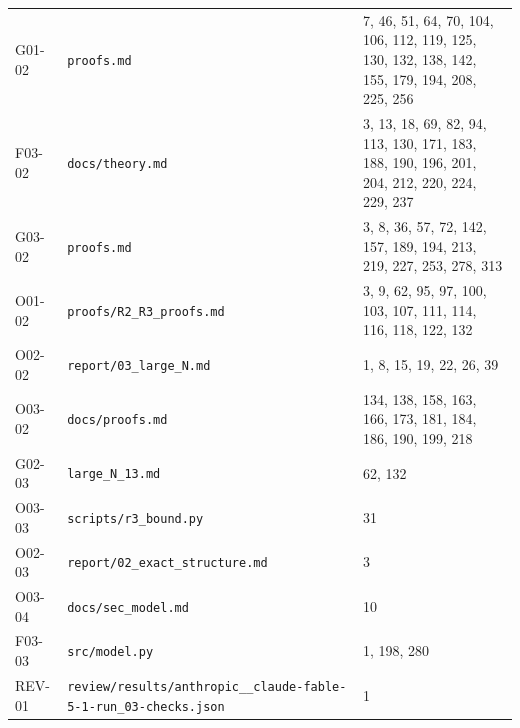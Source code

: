 \documentclass[11pt,a4paper]{article}
\begin{document}
{\begin{longtable}
{}\label{src:G01-02}G01-02 & \nolinkurl{proofs.md} & 7,\allowbreak{} 46,\allowbreak{} 51,\allowbreak{} 64,\allowbreak{} 70,\allowbreak{} 104,\allowbreak{} 106,\allowbreak{} 112,\allowbreak{} 119,\allowbreak{} 125,\allowbreak{} 130,\allowbreak{} 132,\allowbreak{} 138,\allowbreak{} 142,\allowbreak{} 155,\allowbreak{} 179,\allowbreak{} 194,\allowbreak{} 208,\allowbreak{} 225,\allowbreak{} 256\tabularnewline
{}\label{src:F03-02}F03-02 & \nolinkurl{docs/theory.md} & 3,\allowbreak{} 13,\allowbreak{} 18,\allowbreak{} 69,\allowbreak{} 82,\allowbreak{} 94,\allowbreak{} 113,\allowbreak{} 130,\allowbreak{} 171,\allowbreak{} 183,\allowbreak{} 188,\allowbreak{} 190,\allowbreak{} 196,\allowbreak{} 201,\allowbreak{} 204,\allowbreak{} 212,\allowbreak{} 220,\allowbreak{} 224,\allowbreak{} 229,\allowbreak{} 237\tabularnewline
{}\label{src:G03-02}G03-02 & \nolinkurl{proofs.md} & 3,\allowbreak{} 8,\allowbreak{} 36,\allowbreak{} 57,\allowbreak{} 72,\allowbreak{} 142,\allowbreak{} 157,\allowbreak{} 189,\allowbreak{} 194,\allowbreak{} 213,\allowbreak{} 219,\allowbreak{} 227,\allowbreak{} 253,\allowbreak{} 278,\allowbreak{} 313\tabularnewline
{}\label{src:O01-02}O01-02 & \nolinkurl{proofs/R2_R3_proofs.md} & 3,\allowbreak{} 9,\allowbreak{} 62,\allowbreak{} 95,\allowbreak{} 97,\allowbreak{} 100,\allowbreak{} 103,\allowbreak{} 107,\allowbreak{} 111,\allowbreak{} 114,\allowbreak{} 116,\allowbreak{} 118,\allowbreak{} 122,\allowbreak{} 132\tabularnewline
{}\label{src:O02-02}O02-02 & \nolinkurl{report/03_large_N.md} & 1,\allowbreak{} 8,\allowbreak{} 15,\allowbreak{} 19,\allowbreak{} 22,\allowbreak{} 26,\allowbreak{} 39\tabularnewline
{}\label{src:O03-02}O03-02 & \nolinkurl{docs/proofs.md} & 134,\allowbreak{} 138,\allowbreak{} 158,\allowbreak{} 163,\allowbreak{} 166,\allowbreak{} 173,\allowbreak{} 181,\allowbreak{} 184,\allowbreak{} 186,\allowbreak{} 190,\allowbreak{} 199,\allowbreak{} 218\tabularnewline
{}\label{src:G02-03}G02-03 & \nolinkurl{large_N_13.md} & 62,\allowbreak{} 132\tabularnewline
{}\label{src:O03-03}O03-03 & \nolinkurl{scripts/r3_bound.py} & 31\tabularnewline
{}\label{src:O02-03}O02-03 & \nolinkurl{report/02_exact_structure.md} & 3\tabularnewline
{}\label{src:O03-04}O03-04 & \nolinkurl{docs/sec_model.md} & 10\tabularnewline
{}\label{src:F03-03}F03-03 & \nolinkurl{src/model.py} & 1,\allowbreak{} 198,\allowbreak{} 280\tabularnewline
{}\label{src:REV-01}REV-01 & \nolinkurl{review/results/anthropic__claude-fable-5-1-run_03-checks.json} & 1\tabularnewline

\end{longtable}}
\end{document}
